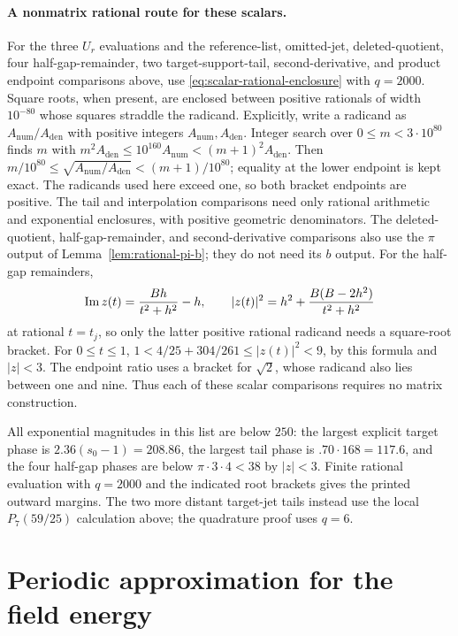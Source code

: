\paragraph{A nonmatrix rational route for these scalars.}
For the three $U_r$ evaluations and the reference-list, omitted-jet,
deleted-quotient, four half-gap-remainder, two target-support-tail,
second-derivative, and product
endpoint comparisons above, use \eqref{eq:scalar-rational-enclosure} with
$q=2000$.  Square roots, when present, are enclosed between positive
rationals of width $10^{-80}$ whose squares straddle the radicand.
Explicitly, write a radicand as $A_{\mathrm{num}}/A_{\mathrm{den}}$ with
positive integers $A_{\mathrm{num}},A_{\mathrm{den}}$.  Integer search over
$0\le m<3\cdot10^{80}$ finds $m$ with
$m^2A_{\mathrm{den}}\le10^{160}A_{\mathrm{num}}<(m+1)^2A_{\mathrm{den}}$.
Then $m/10^{80}\le\sqrt{A_{\mathrm{num}}/A_{\mathrm{den}}}<(m+1)/10^{80}$;
equality at the lower endpoint is kept exact.  The radicands used here exceed
one, so both bracket endpoints are positive.
The tail and interpolation comparisons need only rational arithmetic and
exponential enclosures, with positive geometric denominators.
The deleted-quotient, half-gap-remainder, and second-derivative comparisons
also use the $\pi$ output of Lemma~\ref{lem:rational-pi-b}; they do not
need its $b$ output.  For the half-gap remainders,
\[
 \operatorname{Im} z(t)=\frac{Bh}{t^2+h^2}-h,\qquad
 |z(t)|^2=h^2+\frac{B(B-2h^2)}{t^2+h^2}
\]
at rational $t=t_j$, so only the latter positive rational radicand needs
a square-root bracket.  For $0\le t\le1$,
$1<4/25+304/261\le |z(t)|^2<9$, by this formula and $|z|<3$.
The endpoint ratio uses a bracket for $\sqrt2$, whose radicand also lies
between one and nine.
Thus each of these scalar comparisons requires no matrix construction.

All exponential magnitudes in this list are below $250$: the largest
explicit target phase is $2.36(s_0-1)=208.86$, the largest tail phase
is $.70\cdot168=117.6$, and the four half-gap phases are below
$\pi\cdot3\cdot4<38$ by $|z|<3$.  Finite rational evaluation with
$q=2000$ and the indicated root brackets gives the printed outward
margins.  The two more distant target-jet tails instead use the local
$P_7(59/25)$ calculation above; the quadrature proof uses $q=6$.

\section{Periodic approximation for the field energy}
\label{app:normalized-periodic-approximation}

